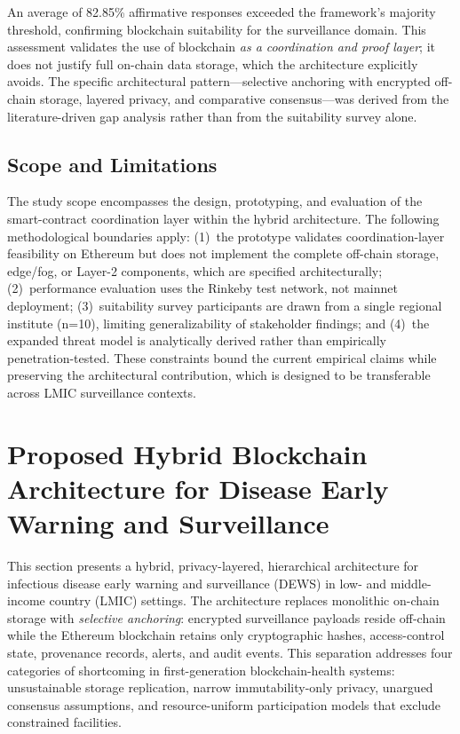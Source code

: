 An average of 82.85\% affirmative responses exceeded the framework's majority threshold, confirming blockchain suitability for the surveillance domain. This assessment validates the use of blockchain \emph{as a coordination and proof layer}; it does not justify full on-chain data storage, which the architecture explicitly avoids. The specific architectural pattern---selective anchoring with encrypted off-chain storage, layered privacy, and comparative consensus---was derived from the literature-driven gap analysis rather than from the suitability survey alone.

\subsection{Scope and Limitations}\label{subsec:scope}

The study scope encompasses the design, prototyping, and evaluation of the smart-contract coordination layer within the hybrid architecture. The following methodological boundaries apply: (1)~the prototype validates coordination-layer feasibility on Ethereum but does not implement the complete off-chain storage, edge/fog, or Layer-2 components, which are specified architecturally; (2)~performance evaluation uses the Rinkeby test network, not mainnet deployment; (3)~suitability survey participants are drawn from a single regional institute (n=10), limiting generalizability of stakeholder findings; and (4)~the expanded threat model is analytically derived rather than empirically penetration-tested. These constraints bound the current empirical claims while preserving the architectural contribution, which is designed to be transferable across LMIC surveillance contexts.


\section{Proposed Hybrid Blockchain Architecture for Disease Early Warning and Surveillance}\label{sec:model}

This section presents a hybrid, privacy-layered, hierarchical architecture for infectious disease early warning and surveillance (DEWS) in low- and middle-income country (LMIC) settings. The architecture replaces monolithic on-chain storage with \emph{selective anchoring}: encrypted surveillance payloads reside off-chain while the Ethereum blockchain retains only cryptographic hashes, access-control state, provenance records, alerts, and audit events. This separation addresses four categories of shortcoming in first-generation blockchain-health systems: unsustainable storage replication, narrow immutability-only privacy, unargued consensus assumptions, and resource-uniform participation models that exclude constrained facilities.

